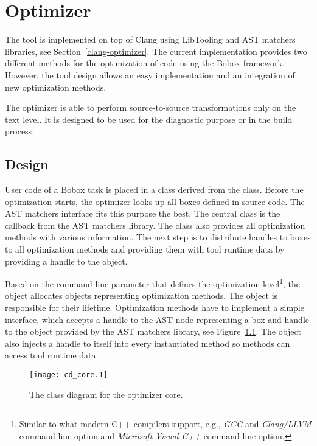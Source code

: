 \chapter{Optimizer}
\label{chapter-design}
The tool is implemented on top of Clang using LibTooling and AST matchers libraries, see Section~\ref{clang-optimizer}. The current implementation provides two different methods for the optimization of code using the Bobox framework. However, the tool design allows an easy implementation and an integration of new optimization methods.

The optimizer is able to perform source-to-source transformations only on the text level. It is designed to be used for the diagnostic purpose or in the build process.

\section{Design}
User code of a Bobox task is placed in a class derived from the  class. Before the optimization starts, the optimizer looks up all boxes defined in source code. The AST matchers interface fits this purpose the best. The central  class is the callback from the AST matchers library. The class also provides all optimization methods with various information. The next step is to distribute handles to boxes to all optimization methods and providing them with tool runtime data by providing a handle to the  object.

Based on the command line parameter that defines the optimization level\footnote{Similar to what modern C++ compilers support, e.g., \emph{GCC} and \emph{Clang/LLVM}  command line option and \emph{Microsoft Visual C++}  command line option.}, the  object allocates objects representing optimization methods. The  object is responsible for their lifetime. Optimization methods have to implement a simple interface, which accepts a handle to the AST node representing a box and handle to the  object provided by the AST matchers library, see Figure~\ref{class-optimizer}. The  object also injects a handle to itself into every instantiated method so methods can access tool runtime data.

\begin{figure}[h!]
\caption{The class diagram for the optimizer core.}
\label{class-optimizer}
\vspace{0.5cm}
\centering
\texttt{[image: cd\_core.1]}
\end{figure}


